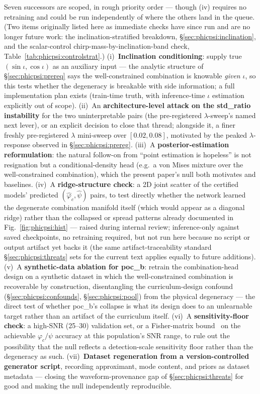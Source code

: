 Seven successors are scoped, in rough priority order --- though (iv) requires no retraining and could be run independently of where the others land in the queue.
(Two items originally listed here as immediate checks have since run and are no longer future work: the inclination-stratified breakdown, \S\ref{sec:phicpsi:inclination}, and the scalar-control chirp-mass-by-inclination-band check, Table~\ref{tab:phicpsi:controlstrat}.)
(i)~\textbf{Inclination conditioning}: supply true $(\sin\iota, \cos\iota)$ as an auxiliary input --- the analytic structure of \S\ref{sec:phicpsi:prereq} says the well-constrained combination is knowable \emph{given} $\iota$, so this tests whether the degeneracy is breakable with side information; a full implementation plan exists (train-time truth, with inference-time $\iota$ estimation explicitly out of scope).
(ii)~An \textbf{architecture-level attack on the std\_ratio instability} for the two uninterpretable pairs (the pre-registered $\lambda$-sweep's named next lever), or an explicit decision to close that thread; alongside it, a finer freshly pre-registered $\lambda$ mini-sweep over $[0.02, 0.08]$, motivated by the peaked $\lambda$-response observed in \S\ref{sec:phicpsi:prereg}.
(iii)~A \textbf{posterior-estimation reformulation}: the natural follow-on from ``point estimation is hopeless'' is not resignation but a conditional-density head (e.g.\ a von Mises mixture over the well-constrained combination), which the present paper's null both motivates and baselines.
(iv)~A \textbf{ridge-structure check}: a 2D joint scatter of the certified models' predicted $(\hat\varphi_c, \hat\psi)$ pairs, to test directly whether the network learned the degenerate combination manifold itself (which would appear as a diagonal ridge) rather than the collapsed or spread patterns already documented in Fig.~\ref{fig:phicpsi:hist} --- raised during internal review; inference-only against saved checkpoints, no retraining required, but not run here because no script or output artifact yet backs it (the same artifact-traceability standard \S\ref{sec:phicpsi:threats} sets for the current text applies equally to future additions).
(v)~A \textbf{synthetic-data ablation for poc\_b}: retrain the combination-head design on a synthetic dataset in which the well-constrained combination is recoverable by construction, disentangling the curriculum-design confound (\S\ref{sec:phicpsi:confounds}, \S\ref{sec:phicpsi:pool}) from the physical degeneracy --- the direct test of whether poc\_b's collapse is what its design does to an unlearnable target rather than an artifact of the curriculum itself.
(vi)~A \textbf{sensitivity-floor check}: a high-SNR (25--30) validation set, or a Fisher-matrix bound~\citep{vallisneri2008fisher} on the achievable $\varphi_c/\psi$ accuracy at this population's SNR range, to rule out the possibility that the null reflects a detection-scale sensitivity floor rather than the degeneracy as such.
(vii)~\textbf{Dataset regeneration from a version-controlled generator script}, recording approximant, mode content, and priors as dataset metadata --- closing the waveform-provenance gap of \S\ref{sec:phicpsi:threats} for good and making the null independently reproducible.